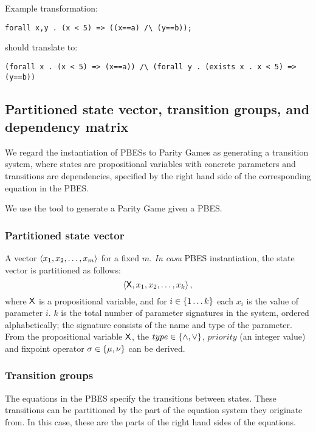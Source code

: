 \documentclass{article}
\begin{document}
\begin{example}\label{example:quantifier-rewrite}
Example transformation:
\begin{verbatim}
forall x,y . (x < 5) => ((x==a) /\ (y==b));
\end{verbatim}
should translate to:
\begin{verbatim}
(forall x . (x < 5) => (x==a)) /\ (forall y . (exists x . x < 5) => (y==b))
\end{verbatim}
\end{example}







\subsection{Partitioned state vector, transition groups, and dependency matrix}

We regard the instantiation of PBESs to Parity Games as generating a transition system, where states are propositional variables with concrete parameters and transitions are dependencies, specified by the right hand side of the corresponding equation in the PBES.

We use the tool \LTSMIN to generate a Parity Game given a PBES.


\subsubsection{Partitioned state vector}

A vector $\left\langle x_1, x_2, \dotsc, x_m \right\rangle$ for a fixed $m$.
\textit{In casu} PBES instantiation, the state vector is partitioned as follows:
\[ \left\langle \mathsf{X}, x_1, x_2, \dotsc, x_k  \right\rangle, \]
where $\mathsf{X}$ is a propositional variable, and for $i \in \left\lbrace 1 \ldots k \right\rbrace$ each $x_i$ is the value of parameter $i$. $k$ is the total number of parameter signatures in the system, ordered alphabetically; the signature consists of the name and type of the parameter.
From the propositional variable $\mathsf{X}$, the $type \in \left\lbrace \land, \lor \right\rbrace$, $priority$ (an integer value) and fixpoint operator $\sigma \in \left\lbrace \mu, \nu \right\rbrace$ can be derived. 


\subsubsection{Transition groups}
The equations in the PBES specify the transitions between states. These transitions can be partitioned by the part of the equation system they originate from.
In this case, these are the parts of the right hand sides of the equations.
\end{document}
